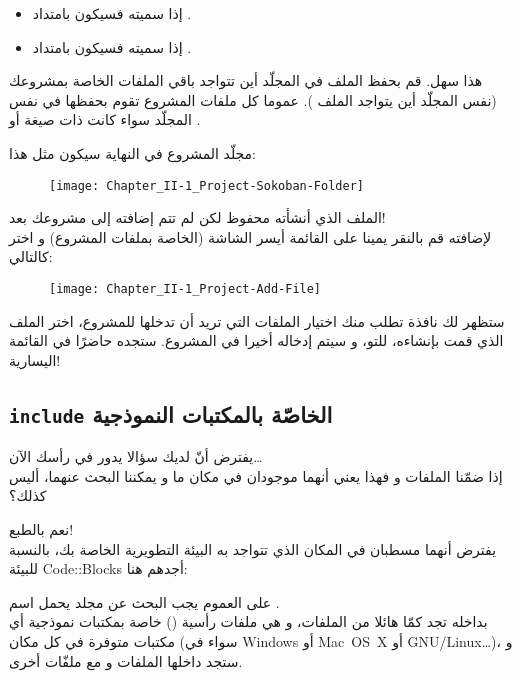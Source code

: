 \begin{itemize}
  \item إذا سميته
فسيكون بامتداد
.
  \item إذا سميته
فسيكون بامتداد
.
\end{itemize}

هذا سهل. قم بحفظ الملف في المجلّد أين تتواجد باقي الملفات الخاصة بمشروعك (نفس المجلّد أين يتواجد الملف
). عموما كل ملفات المشروع تقوم بحفظها في نفس المجلّد سواء كانت ذات صيغة
أو
.

مجلّد المشروع في النهاية سيكون مثل هذا:

\begin{figure}[H]
	\centering
	\texttt{[image: Chapter\_II-1\_Project-Sokoban-Folder]}
\end{figure}

الملف الذي أنشأته محفوظ لكن لم تتم إضافته إلى مشروعك بعد!\\
لإضافته قم بالنقر يمينا على القائمة أيسر الشاشة (الخاصة بملفات المشروع) و اختر
كالتالي:

\begin{figure}[H]
	\centering
	\texttt{[image: Chapter\_II-1\_Project-Add-File]}
\end{figure}

ستظهر لك نافذة تطلب منك اختيار الملفات التي تريد أن تدخلها للمشروع، اختر الملف الذي قمت بإنشاءه، للتو، و سيتم إدخاله أخيرا في المشروع.  ستجده حاضرًا في القائمة اليسارية!

\subsection{\texttt{include} الخاصّة بالمكتبات النموذجية}

يفترض أنّ لديك سؤالا يدور في رأسك الآن\dots\\
إذا ضمّنا الملفات
و
فهذا يعني أنهما موجودان في مكان ما و يمكننا البحث عنهما، أليس كذلك؟

نعم بالطبع!\\
يفترض أنهما مسطبان في المكان الذي تتواجد به البيئة التطويرية الخاصة بك، بالنسبة للبيئة
\textenglish{Code::Blocks}
أجدهم هنا:


على العموم يجب البحث عن مجلد يحمل اسم
.\\
بداخله تجد كمّا هائلا من الملفات، و هي ملفات رأسية
()
خاصة بمكتبات نموذجية أي مكتبات متوفرة في كل مكان (سواء في 
\textenglish{Windows}
أو
\textenglish{\mbox{Mac OS X}}
أو 
\textenglish{\mbox{GNU/Linux}}\dots)،
و ستجد داخلها الملفات
و
مع ملفّات أخرى.

